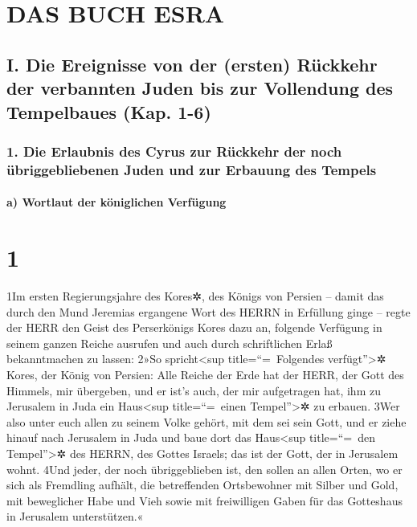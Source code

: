 \hypertarget{das-buch-esra}{%
\section{DAS BUCH ESRA}\label{das-buch-esra}}

\hypertarget{i.-die-ereignisse-von-der-ersten-ruxfcckkehr-der-verbannten-juden-bis-zur-vollendung-des-tempelbaues-kap.-1-6}{%
\subsection{I. Die Ereignisse von der (ersten) Rückkehr der verbannten
Juden bis zur Vollendung des Tempelbaues (Kap.
1-6)}\label{i.-die-ereignisse-von-der-ersten-ruxfcckkehr-der-verbannten-juden-bis-zur-vollendung-des-tempelbaues-kap.-1-6}}

\hypertarget{die-erlaubnis-des-cyrus-zur-ruxfcckkehr-der-noch-uxfcbriggebliebenen-juden-und-zur-erbauung-des-tempels}{%
\subsubsection{1. Die Erlaubnis des Cyrus zur Rückkehr der noch
übriggebliebenen Juden und zur Erbauung des
Tempels}\label{die-erlaubnis-des-cyrus-zur-ruxfcckkehr-der-noch-uxfcbriggebliebenen-juden-und-zur-erbauung-des-tempels}}

\hypertarget{a-wortlaut-der-kuxf6niglichen-verfuxfcgung}{%
\paragraph{a) Wortlaut der königlichen
Verfügung}\label{a-wortlaut-der-kuxf6niglichen-verfuxfcgung}}

\hypertarget{section}{%
\section{1}\label{section}}

1Im ersten Regierungsjahre des Kores✲, des Königs von Persien -- damit
das durch den Mund Jeremias ergangene Wort des HERRN in Erfüllung ginge
-- regte der HERR den Geist des Perserkönigs Kores dazu an, folgende
Verfügung in seinem ganzen Reiche ausrufen und auch durch schriftlichen
Erlaß bekanntmachen zu lassen: 2»So spricht\textless sup
title=``=~Folgendes verfügt''\textgreater✲ Kores, der König von Persien:
Alle Reiche der Erde hat der HERR, der Gott des Himmels, mir übergeben,
und er ist's auch, der mir aufgetragen hat, ihm zu Jerusalem in Juda ein
Haus\textless sup title=``=~einen Tempel''\textgreater✲ zu erbauen. 3Wer
also unter euch allen zu seinem Volke gehört, mit dem sei sein Gott, und
er ziehe hinauf nach Jerusalem in Juda und baue dort das
Haus\textless sup title=``=~den Tempel''\textgreater✲ des HERRN, des
Gottes Israels; das ist der Gott, der in Jerusalem wohnt. 4Und jeder,
der noch übriggeblieben ist, den sollen an allen Orten, wo er sich als
Fremdling aufhält, die betreffenden Ortsbewohner mit Silber und Gold,
mit beweglicher Habe und Vieh sowie mit freiwilligen Gaben für das
Gotteshaus in Jerusalem unterstützen.«

